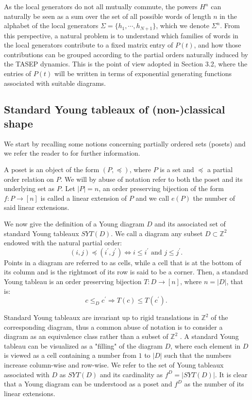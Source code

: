 \documentclass{article}
\begin{document}
As the local generators do not all mutually commute, the powers $H^n$ can naturally be seen as a sum over the set of all possible words of length $n$ in the alphabet of the local generators $\Sigma=\{h_1,\cdots,h_{N+1}\}$, which we denote $\Sigma^n$.
From this perspective, a natural problem is to understand which families of words in the local generators contribute to a fixed matrix entry of \(P(t)\), and how those contributions can be grouped according to the partial orders naturally induced by the TASEP dynamics. This is the point of view adopted in Section 3.2, where the entries of \(P(t)\) will be written in terms of exponential generating functions associated with suitable diagrams.


\subsection{ Standard Young tableaux of (non-)classical shape}
\label{comb_prel}
We start by recalling some notions concerning partially ordered sets (posets) and we refer the reader to \cite{EnumComb2} for further information.

A poset is an object of the form $(P,\preceq)$, where $P$ is a set and $\preceq$ a partial order relation on $P$. We will by abuse of notation refer to both the poset and its underlying set as $P$. Let $|P|=n$, an order preserving bijection of the form $f\colon P\to[n]$ is called a linear extension of $P$ and we call $e(P)$ the number of said linear extensions. 

We now give the definition of a Young diagram $D$ and its associated set of standard Young tableaux $SYT(D)$.
We call a diagram any subset $D\subset\mathbb{Z}^2$ endowed with the natural partial order:
\begin{equation}
\label{partial}
(i, j) \preceq\left(i^{\prime}, j^{\prime}\right) \Longleftrightarrow i \leq i^{\prime} \text { and } j \leq j^{\prime}.
\end{equation}
Points in a diagram are referred to as cells, while a cell that is at the bottom of its column and is the rightmost of its row is said to be a corner.
Then, a standard Young tableau is an order preserving bijection $T\colon D\to [n]$, where $n=|D|$, that is:
\[
    c \leq_D c^{\prime} \Longrightarrow T(c) \leq T\left(c^{\prime}\right).
\]

Standard Young tableaux are invariant up to rigid translations in $\mathbb{Z}^2$ of the corresponding diagram, thus a common abuse of notation is to consider a diagram as an equivalence class  rather than a subset of $\mathbb{Z}^2$ .
A standard Young tableau can be visualized as a "filling" of the diagram $D$, where each element in $D$ is viewed as a cell containing a number from $1$ to $|D|$ such that the numbers increase column-wise 
and row-wise. We refer to the set of Young tableaux associated with $D$ as $SYT(D)$ and its cardinality as $f^D=|SYT(D)|$.
It is clear that a Young diagram can be understood as a poset and $f^D$ as the number of its linear extensions. \\
\end{document}
